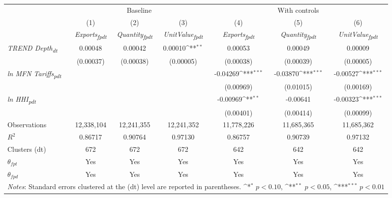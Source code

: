 {
\def\sym#1{\ifmmode^{#1}\else\(^{#1}\)\fi}
\begin{tabular}{l*{6}{c}}
\toprule
&\multicolumn{3}{c}{Baseline}&\multicolumn{3}{c}{With controls}\\\cmidrule(lr){2-4}\cmidrule(lr){5-7}
&(1)&(2)&(3)&(4)&(5)&(6)\\
&\textit{Exports\textsubscript{fpdt}}&\textit{Quantity\textsubscript{fpdt}}&\textit{UnitValue\textsubscript{fpdt}}&\textit{Exports\textsubscript{fpdt}}&\textit{Quantity\textsubscript{fpdt}}&\textit{UnitValue\textsubscript{fpdt}}\\
\midrule
\textit{TREND Depth\textsubscript{dt}} & 0.00048 & 0.00042 & 0.00010\sym{**} & 0.00053 & 0.00049 & 0.00009\\
 & (0.00037) & (0.00038) & (0.00005) & (0.00038) & (0.00039) & (0.00005)\\
\addlinespace
\textit{ln MFN Tariffs\textsubscript{pdt}} &  &  &  & -0.04269\sym{***} & -0.03870\sym{***} & -0.00527\sym{***}\\
 &  &  &  & (0.00969) & (0.01015) & (0.00169)\\
\addlinespace
\textit{ln HHI\textsubscript{pdt}} &  &  &  & -0.00969\sym{**} & -0.00641 & -0.00323\sym{***}\\
 &  &  &  & (0.00401) & (0.00414) & (0.00099)\\
\midrule
Observations & 12,338,104 & 12,241,355 & 12,241,352 & 11,778,226 & 11,685,365 & 11,685,362\\
$R^{2}$ & 0.86717 & 0.90764 & 0.97130 & 0.86757 & 0.90739 & 0.97132\\
Clusters (dt) & 672 & 672 & 672 & 642 & 642 & 642\\
$\theta_{fpt}$ & Yes & Yes & Yes & Yes & Yes & Yes\\
$\theta_{fpd}$ & Yes & Yes & Yes & Yes & Yes & Yes\\
\bottomrule
\multicolumn{7}{l}{\footnotesize \textit{Notes}: Standard errors clustered at the (dt) level are reported in parentheses. \sym{*} \(p<0.10\), \sym{**} \(p<0.05\), \sym{***} \(p<0.01\)}\\
\end{tabular}
}
